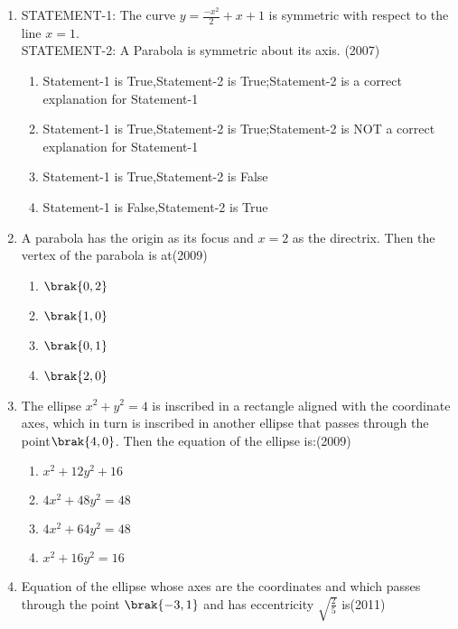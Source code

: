 	\begin{enumerate}

\item STATEMENT-1: The curve $y=\frac{-x^2}{2}+x+1$ is symmetric with respect to the line $x=1$.
	\\
STATEMENT-2: A Parabola is symmetric about its axis.
\hfill(2007)
			\begin{multicols}{2}
\begin{enumerate}
    \item Statement-1 is True,Statement-2 is True;Statement-2 is a correct explanation for Statement-1\item  Statement-1 is True,Statement-2 is True;Statement-2 is NOT a correct explanation for Statement-1\item Statement-1 is True,Statement-2 is False\item Statement-1 is False,Statement-2 is True
\end{enumerate}\end{multicols}
\item A parabola has the origin as its focus and $x=2$ as the directrix. Then the vertex of the parabola is at\hfill(2009)
	\begin{multicols}{4}
\begin{enumerate}
    \item $\brak{0,2}$
    \item $\brak{1,0}$
    \item $\brak{0,1}$
    \item $\brak{2,0}$
\end{enumerate}\end{multicols}
\item The ellipse $x^2+y^2 = 4$ is inscribed in a rectangle aligned with the coordinate axes, which in turn is inscribed in another ellipse that passes through the point$\brak{4,0}$. Then the equation of the ellipse is:\hfill(2009)
	\begin{multicols}{2}
\begin{enumerate}
    \item $x^2+12y^2+16$
    \item $4x^2+48y^2=48$
    \item $4x^2+64y^2=48$
    \item $x^2+16y^2=16$
\end{enumerate}\end{multicols}
\item Equation of the ellipse whose axes are the coordinates and which passes through the point $\brak{-3,1}$ and has eccentricity $\sqrt{\frac{2}{5}}$ is\hfill(2011)

\end{enumerate}
